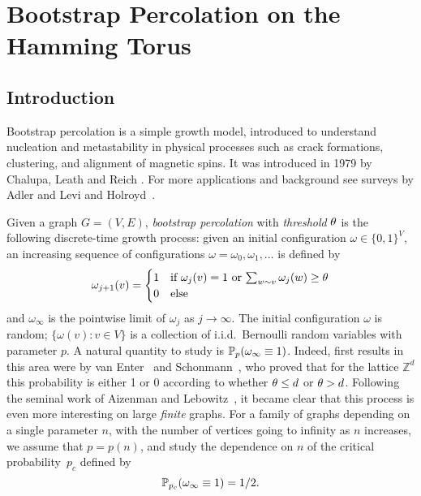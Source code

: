 
\chapter{Bootstrap Percolation on the Hamming Torus}
\label{chap:bootstrap}

\section{Introduction}

 \newcommand{\note}[1]{{\bf \textcolor{blue}
{[#1\marginpar{\textcolor{red}{***}}]}}}
\newcommand{\bfit}[1]
{\emph{\textbf{#1}}}

Bootstrap percolation is a simple growth model, introduced to understand nucleation and metastability in physical processes such as crack formations, clustering, and alignment of magnetic
spins. It was introduced in 1979 by Chalupa, Leath and Reich \cite{bethe}. For more applications and background see surveys by Adler and Levi \cite{brazil} and Holroyd~\cite{holroyd-survey}.

Given a graph $G=(V,E)$, {\it bootstrap percolation\/} with {\it threshold\/} $\theta$
is the following discrete-time growth process: given an initial configuration $\omega \in
\{0,1\}^V$, an increasing sequence of configurations 
$\omega=\omega_0,\omega_1,\ldots$ is defined by
$$
\omega_{j+1}(v)=
\begin{cases}
1& \text{if $\omega_j(v)=1$ or $\sum_{w \sim  v}\omega_j(w) \geq
\theta$}\\
0 &\text{else}
\end{cases}
$$
and $\omega_\infty$ is the pointwise limit of $\omega_j$ as $j\to\infty$.
The initial configuration $\omega$ is random; $\{\omega(v): v \in V\}$ is a collection of i.i.d.\ Bernoulli random variables with parameter $p$. A natural quantity to study is $\mathbb{P}_{p}(\omega_\infty\equiv 1)$. Indeed, first results in this area were by van Enter~\cite{vanenter} and Schonmann~\cite{schonmann}, who proved that for the lattice $\mathbb{Z}^d$ this probability is either 1 or 0 according to whether $\theta \le d$ or $\theta > d$. Following the seminal work of Aizenman and Lebowitz~\cite{aizenman},
it became clear that this process is even more interesting on large {\em finite} graphs.  For a family of graphs depending on a single parameter $n$, with the number of vertices going to infinity as $n$ increases, we assume that $p=p(n)$, and study the dependence on $n$ of the critical probability~$p_c$ defined by
\begin{equation*}
\mathbb{P}_{p_c}(\omega_\infty\equiv1)=1/2.
\end{equation*}

